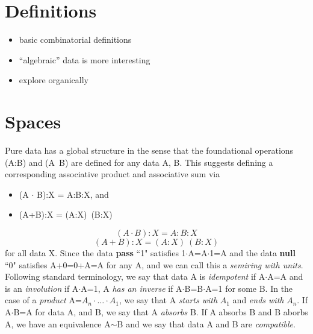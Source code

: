 \documentclass[11pt]{article}
\begin{document}
\section{Definitions}

\begin{itemize}
\item basic combinatorial definitions 
\item ``algebraic'' data is more interesting 
\item explore organically
\end{itemize} 

\section{Spaces}

    Pure data has a global structure in the sense that the foundational operations (A:B) and (A\ B) are defined for any data A, B.  
This suggests defining a corresponding associative product and associative sum via   
\begin{itemize}
\item[] (A $\cdot$ B):X = A:B:X, and 
\item[] (A+B):X = (A:X)\ (B:X) 
\end{itemize}
\begin{equation}
(A \cdot B):X = A:B:X 
\end{equation}
\begin{equation}
(A+B):X = (A:X)\ (B:X) 
\end{equation}
for all data X.  Since the data {\bf pass} ``1" satisfies 1$\cdot$A=A$\cdot$1=A and the data {\bf null} ``0" satisfies A+0=0+A=A for any A, and we can call this a {\it semiring with units}.  
Following standard terminology, we say that data A is {\it idempotent} if A$\cdot$A=A and is an {\it involution} if A$\cdot$A=1, A {\it has an inverse} if A$\cdot$B=B$\cdot$A=1 for some B.   
In the case of a {\it product}  A=$A_n\cdot\dots\cdot A_1$, we say that A {\it starts with} $A_1$ and {\it ends with} $A_n$.  If A$\cdot $B=A for data A, and B, we say that A {\it absorbs} B.  If A absorbs B and B aborbs A, we have an equivalence A$\sim$B and we say that data A and B are {\it compatible}.  
\end{document}
